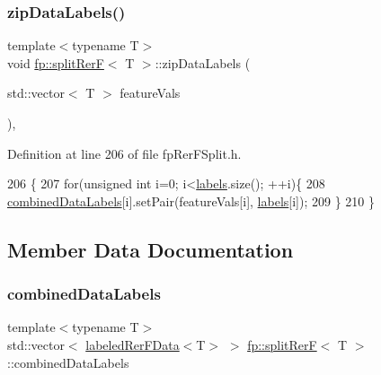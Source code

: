 \subsubsection{\texorpdfstring{zip\+Data\+Labels()}{zipDataLabels()}}
{\footnotesize\ttfamily template$<$typename T$>$ \\
void \hyperlink{classfp_1_1splitRerF}{fp\+::split\+RerF}$<$ T $>$\+::zip\+Data\+Labels (\begin{DoxyParamCaption}\item[{std\+::vector$<$ T $>$}]{feature\+Vals }\end{DoxyParamCaption})\hspace{0.3cm}{\ttfamily [inline]}, {\ttfamily [protected]}}



Definition at line 206 of file fp\+Rer\+F\+Split.\+h.


\begin{DoxyCode}
206                                                                    \{
207                     \textcolor{keywordflow}{for}(\textcolor{keywordtype}{unsigned} \textcolor{keywordtype}{int} i=0; i<\hyperlink{classfp_1_1splitRerF_a85d708ae07bbfae5205111082e4037df}{labels}.size(); ++i)\{
208                         \hyperlink{classfp_1_1splitRerF_a2ce4d0a7ae4ba4958ddcc1adba71b2c9}{combinedDataLabels}[i].setPair(featureVals[i],
      \hyperlink{classfp_1_1splitRerF_a85d708ae07bbfae5205111082e4037df}{labels}[i]);
209                     \}
210                 \}
\end{DoxyCode}


\subsection{Member Data Documentation}
\mbox{\label{classfp_1_1splitRerF_a2ce4d0a7ae4ba4958ddcc1adba71b2c9}} 
\subsubsection{\texorpdfstring{combined\+Data\+Labels}{combinedDataLabels}}
{\footnotesize\ttfamily template$<$typename T$>$ \\
std\+::vector$<$ \hyperlink{classfp_1_1labeledRerFData}{labeled\+Rer\+F\+Data}$<$T$>$ $>$ \hyperlink{classfp_1_1splitRerF}{fp\+::split\+RerF}$<$ T $>$\+::combined\+Data\+Labels\hspace{0.3cm}{\ttfamily [protected]}}



